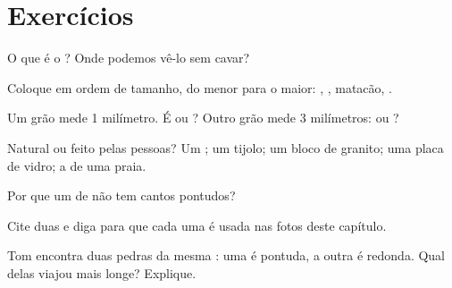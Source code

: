 \section{Exercícios}

\begin{exercise}[$\star$]\label{exo:g3:stones-pebbles-sand:1}
O que é o ? Onde podemos vê-lo sem cavar?
\end{exercise}

\begin{exercise}[$\star$]\label{exo:g3:stones-pebbles-sand:2}
Coloque em ordem de tamanho, do menor para o maior: , , matacão,
.
\end{exercise}

\begin{exercise}[$\star$]\label{exo:g3:stones-pebbles-sand:3}
Um grão mede 1 milímetro. É  ou ? Outro grão mede
3 milímetros:  ou ?
\end{exercise}

\begin{exercise}[$\star$]\label{exo:g3:stones-pebbles-sand:4}
Natural ou feito pelas pessoas? Um ; um tijolo; um bloco de granito;
uma placa de vidro; a  de uma praia.
\end{exercise}

\begin{exercise}[$\star$]\label{exo:g3:stones-pebbles-sand:5}
Por que um  de  não tem cantos pontudos?
\end{exercise}

\begin{exercise}[$\star$]\label{exo:g3:stones-pebbles-sand:6}
Cite duas  e diga para que cada uma é usada nas fotos
deste capítulo.
\end{exercise}

\begin{exercise}[$\star\star$]\label{exo:g3:stones-pebbles-sand:7}
Tom encontra duas pedras da mesma : uma é pontuda, a outra é redonda.
Qual delas viajou mais longe? Explique.
\end{exercise}

